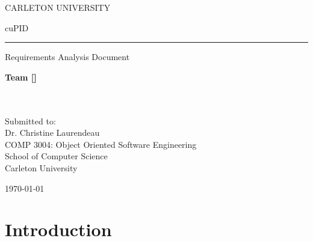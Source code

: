 \documentclass[12pt,letterpaper]{article}
\begin{document}
\newcommand{\ccindent}{\hspace{1.5em}\hangindent=1.5em}
\newcommand{\tableheader}{\rowfont\bf\rowcolor{thcolor!30}}

\thispagestyle{empty}

\begin{center}
	CARLETON UNIVERSITY
\end{center}

\vfill

\begin{center}
	{\fontsize{55pt}{55pt}\selectfont cuPID}
	\vspace{0.5em}\rule{\textwidth}{0.5pt}
	Requirements Analysis Document
\end{center}

\vspace{5em}

\begin{center}
	\textbf{Team [\teamname{}]}\\
	\personone{}\\
	\persontwo{}\\
	\personthree{}
\end{center}

\vfill

\begin{center}
	Submitted to:\\
	Dr. Christine Laurendeau\\
	COMP 3004: Object Oriented Software Engineering\\
	School of Computer Science\\
	Carleton University
\end{center}

\vspace{2em}

\begin{center}
	\today
\end{center}

\newpage{}

\tableofcontents{}

\renewcommand{\listfigurename}{Figures}
\listoffigures

\renewcommand{\listtablename}{Tables}
\listoftables

\newpage{}

\section{Introduction}
\end{document}
